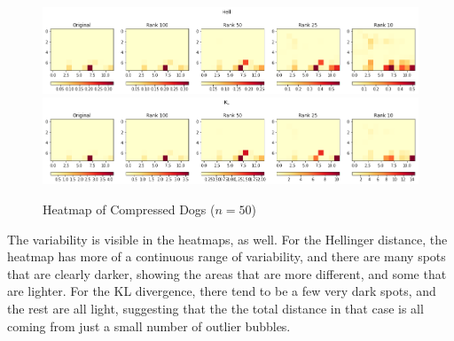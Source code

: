 \documentclass{article}
\begin{document}
\begin{figure}[h!]
\begin{center}
\includegraphics[width=\textwidth]{hell-dogs-50.png}
\includegraphics[width=\textwidth]{kl-dogs-50.png}
\caption{Heatmap of Compressed Dogs ($n=50$)}
\label{fig:dogheat50}
\end{center}
\end{figure}

The variability is visible in the heatmaps, as well. For the Hellinger distance, the heatmap has more of a continuous range of variability, and there are many spots that are clearly darker, showing the areas that are more different, and some that are lighter. For the KL divergence, there tend to be a few very dark spots, and the rest are all light, suggesting that the the total distance in that case is all coming from just a small number of outlier bubbles.

\clearpage
\printbibliography
\end{document}

